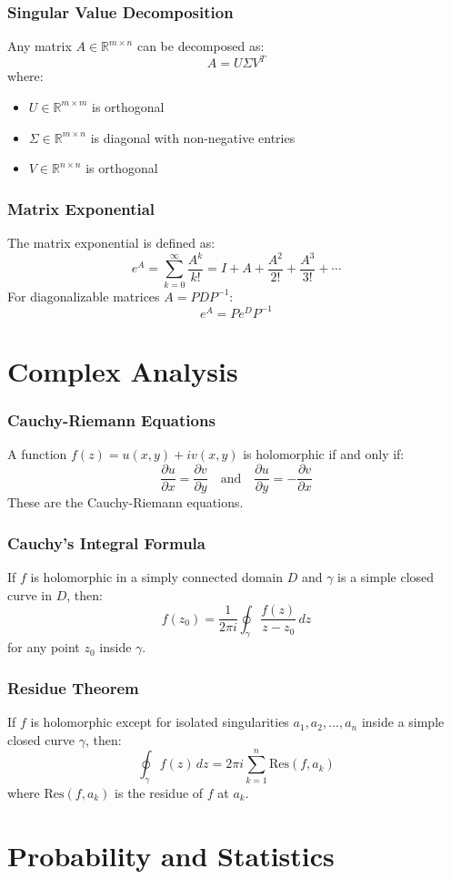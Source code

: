\documentclass{beamer}
\begin{document}
\begin{frame}
\frametitle{Singular Value Decomposition}
Any matrix $A \in \mathbb{R}^{m \times n}$ can be decomposed as:
\[
A = U \Sigma V^T
\]
where:
\begin{itemize}
\item $U \in \mathbb{R}^{m \times m}$ is orthogonal
\item $\Sigma \in \mathbb{R}^{m \times n}$ is diagonal with non-negative entries
\item $V \in \mathbb{R}^{n \times n}$ is orthogonal
\end{itemize}
\end{frame}

\begin{frame}
\frametitle{Matrix Exponential}
The matrix exponential is defined as:
\[
e^A = \sum_{k=0}^{\infty} \frac{A^k}{k!} = I + A + \frac{A^2}{2!} + \frac{A^3}{3!} + \cdots
\]
For diagonalizable matrices $A = PDP^{-1}$:
\[
e^A = P e^D P^{-1}
\]
\end{frame}

\section{Complex Analysis}

\begin{frame}
\frametitle{Cauchy-Riemann Equations}
A function $f(z) = u(x,y) + iv(x,y)$ is holomorphic if and only if:
\[
\frac{\partial u}{\partial x} = \frac{\partial v}{\partial y} \quad \text{and} \quad \frac{\partial u}{\partial y} = -\frac{\partial v}{\partial x}
\]
These are the Cauchy-Riemann equations.
\end{frame}

\begin{frame}
\frametitle{Cauchy's Integral Formula}
If $f$ is holomorphic in a simply connected domain $D$ and $\gamma$ is a simple closed curve in $D$, then:
\[
f(z_0) = \frac{1}{2\pi i} \oint_{\gamma} \frac{f(z)}{z - z_0} \, dz
\]
for any point $z_0$ inside $\gamma$.
\end{frame}

\begin{frame}
\frametitle{Residue Theorem}
If $f$ is holomorphic except for isolated singularities $a_1, a_2, \ldots, a_n$ inside a simple closed curve $\gamma$, then:
\[
\oint_{\gamma} f(z) \, dz = 2\pi i \sum_{k=1}^{n} \text{Res}(f, a_k)
\]
where $\text{Res}(f, a_k)$ is the residue of $f$ at $a_k$.
\end{frame}

\section{Probability and Statistics}
\end{document}
